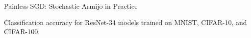 \documentclass[mathserif,notheorems, hyperref={colorlinks, citecolor=blue, urlcolor=blue, linkcolor=blue}]{beamer}
\begin{document}
    \begin{frame}{Painless SGD: Stochastic Armijo in Practice}

        {\large Classification accuracy for ResNet-34 models trained on MNIST, CIFAR-10, and CIFAR-100. }\vspace{0.5em}

        \begin{figure}
            \centering
            \vspace{0.5em}
        \end{figure}

    \end{frame}
    
\end{document}
